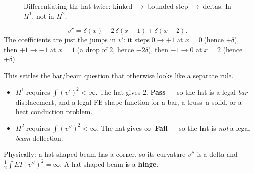 \documentclass[11pt]{article}
\begin{document}
\begin{figure}[htbp]
\caption{Differentiating the hat twice: kinked $\to$ bounded step $\to$ deltas. In $H^{1}$, not in $H^{2}$.}
\label{fig:ladder}
\end{figure}

\begin{equation}
  v'' = \delta(x) - 2\,\delta(x-1) + \delta(x-2).
\end{equation}
The coefficients are just the jumps in $v'$: it steps $0\to+1$ at $x=0$
(hence $+\delta$), then $+1\to-1$ at $x=1$ (a drop of $2$, hence $-2\delta$),
then $-1\to0$ at $x=2$ (hence $+\delta$).

\begin{intuition}
This settles the bar/beam question that otherwise looks like a separate rule.
\begin{itemize}[leftmargin=1.4em,itemsep=2pt]
  \item $H^{1}$ requires $\int(v')^{2}<\infty$. The hat gives $2$. \textbf{Pass}
        --- so the hat is a legal \emph{bar} displacement, and a legal FE shape
        function for a bar, a truss, a solid, or a heat conduction problem.
  \item $H^{2}$ requires $\int(v'')^{2}<\infty$. The hat gives $\infty$.
        \textbf{Fail} --- so the hat is \emph{not} a legal \emph{beam}
        deflection.
\end{itemize}
Physically: a hat-shaped beam has a corner, so its curvature $v''$ is a delta
and $\tfrac12\int EI(v'')^{2}=\infty$. A hat-shaped beam is a \textbf{hinge}.
\end{intuition}
\end{document}
